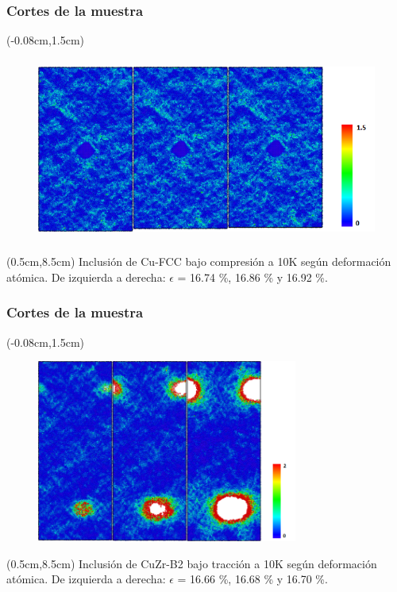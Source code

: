 \begin{frame}
  \frametitle{Cortes de la muestra}
  \begin{textblock*}{12.6cm}(-0.08cm,1.5cm) 
    \begin{figure}[htp]
     \centering
     \includegraphics[height=6cm]{../Presentacion/Nanoparticles/cuSphereCompression_10K_Snapshots.png}
    \end{figure}
  \end{textblock*}
  \begin{textblock*}{12cm}(0.5cm,8.5cm) 
    \centering
      \small{Inclusi\'on de Cu-FCC bajo compresi\'on a 10K según deformaci\'on atómica. De izquierda a derecha: $\epsilon$ = 16.74 \%, 16.86 \% y 16.92 \%.}
    \end{textblock*}
\end{frame}

\begin{frame}
  \frametitle{Cortes de la muestra}
  \begin{textblock*}{12.6cm}(-0.08cm,1.5cm) 
    \begin{figure}[htp]
     \centering
     \includegraphics[height=6cm]{../Presentacion/Nanoparticles/B2SphereTension_10K_Snapshots.png}
    \end{figure}
  \end{textblock*}
  \begin{textblock*}{12cm}(0.5cm,8.5cm) 
    \centering
      \small{Inclusión de CuZr-B2 bajo tracción a 10K según deformación atómica. De izquierda a derecha: $\epsilon$ = 16.66 \%, 16.68 \% y 16.70 \%.}
    \end{textblock*}
\end{frame}

